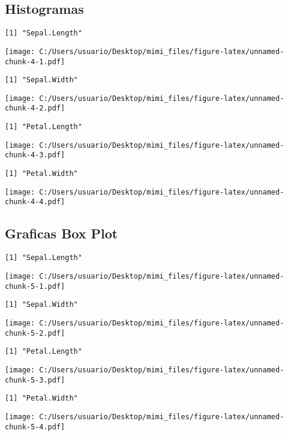 \documentclass[]{article}
\begin{document}
\pagebreak

\subsection{Histogramas}\label{histogramas}

\begin{verbatim}
[1] "Sepal.Length"
\end{verbatim}

\texttt{[image: C:/Users/usuario/Desktop/mimi\_files/figure-latex/unnamed-chunk-4-1.pdf]}

\begin{verbatim}
[1] "Sepal.Width"
\end{verbatim}

\texttt{[image: C:/Users/usuario/Desktop/mimi\_files/figure-latex/unnamed-chunk-4-2.pdf]}

\begin{verbatim}
[1] "Petal.Length"
\end{verbatim}

\texttt{[image: C:/Users/usuario/Desktop/mimi\_files/figure-latex/unnamed-chunk-4-3.pdf]}

\begin{verbatim}
[1] "Petal.Width"
\end{verbatim}

\texttt{[image: C:/Users/usuario/Desktop/mimi\_files/figure-latex/unnamed-chunk-4-4.pdf]}

\subsection{Graficas Box Plot}\label{graficas-box-plot}

\begin{verbatim}
[1] "Sepal.Length"
\end{verbatim}

\texttt{[image: C:/Users/usuario/Desktop/mimi\_files/figure-latex/unnamed-chunk-5-1.pdf]}

\begin{verbatim}
[1] "Sepal.Width"
\end{verbatim}

\texttt{[image: C:/Users/usuario/Desktop/mimi\_files/figure-latex/unnamed-chunk-5-2.pdf]}

\begin{verbatim}
[1] "Petal.Length"
\end{verbatim}

\texttt{[image: C:/Users/usuario/Desktop/mimi\_files/figure-latex/unnamed-chunk-5-3.pdf]}

\begin{verbatim}
[1] "Petal.Width"
\end{verbatim}

\texttt{[image: C:/Users/usuario/Desktop/mimi\_files/figure-latex/unnamed-chunk-5-4.pdf]}
\end{document}
